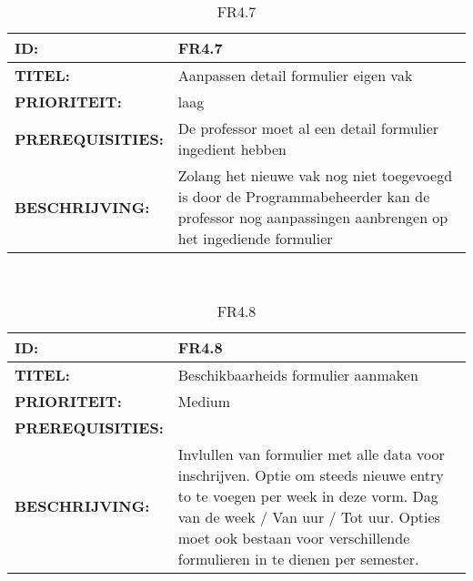\noindent\begin{table}[h]
            \begin{tabular}{l | p{10cm}}
                \textbf{ID:} & FR4.7 \\ \hline
                \textbf{TITEL:} & Aanpassen detail formulier eigen vak \\ \hline
                \textbf{PRIORITEIT:} &  laag \\ \hline
                \textbf{PREREQUISITIES:} & De professor moet al een detail formulier ingedient hebben\\ \hline
                \textbf{BESCHRIJVING:} & Zolang het nieuwe vak nog niet toegevoegd is door de Programmabeheerder kan de professor nog aanpassingen aanbrengen op het ingediende formulier\\ 
            \end{tabular}\\
            \caption{FR4.7}
            \label{tab:myfourteenthtable}
        \end{table}
        
\noindent\begin{table}[h]
            \begin{tabular}{l | p{10cm}}
                \textbf{ID:} & FR4.8 \\ \hline
                \textbf{TITEL:} & Beschikbaarheids formulier aanmaken \\ \hline
                \textbf{PRIORITEIT:} &  Medium \\ \hline
                \textbf{PREREQUISITIES:} & \\ \hline
                \textbf{BESCHRIJVING:} & 
                Invlullen van formulier met alle data voor inschrijven. Optie om steeds nieuwe entry to te voegen per week in deze vorm. Dag van de week / Van uur / Tot uur. Opties moet ook bestaan voor verschillende formulieren in te dienen per semester.\\
            \end{tabular}\\
            \caption{FR4.8}
            \label{tab:myfourteenthtable}
        \end{table}
        
